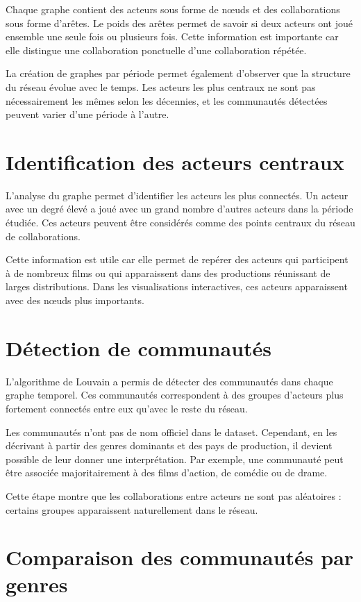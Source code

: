 \documentclass[11pt,a4paper,oneside,openany]{report}
\begin{document}
Chaque graphe contient des acteurs sous forme de nœuds et des collaborations sous forme d’arêtes. Le poids des arêtes permet de savoir si deux acteurs ont joué ensemble une seule fois ou plusieurs fois. Cette information est importante car elle distingue une collaboration ponctuelle d’une collaboration répétée.

La création de graphes par période permet également d’observer que la structure du réseau évolue avec le temps. Les acteurs les plus centraux ne sont pas nécessairement les mêmes selon les décennies, et les communautés détectées peuvent varier d’une période à l’autre.

\section{Identification des acteurs centraux}

L’analyse du graphe permet d’identifier les acteurs les plus connectés. Un acteur avec un degré élevé a joué avec un grand nombre d’autres acteurs dans la période étudiée. Ces acteurs peuvent être considérés comme des points centraux du réseau de collaborations.

Cette information est utile car elle permet de repérer des acteurs qui participent à de nombreux films ou qui apparaissent dans des productions réunissant de larges distributions. Dans les visualisations interactives, ces acteurs apparaissent avec des nœuds plus importants.

\section{Détection de communautés}

L’algorithme de Louvain a permis de détecter des communautés dans chaque graphe temporel. Ces communautés correspondent à des groupes d’acteurs plus fortement connectés entre eux qu’avec le reste du réseau.

Les communautés n’ont pas de nom officiel dans le dataset. Cependant, en les décrivant à partir des genres dominants et des pays de production, il devient possible de leur donner une interprétation. Par exemple, une communauté peut être associée majoritairement à des films d’action, de comédie ou de drame.

Cette étape montre que les collaborations entre acteurs ne sont pas aléatoires : certains groupes apparaissent naturellement dans le réseau.

\section{Comparaison des communautés par genres}
\end{document}
